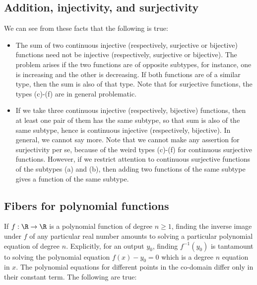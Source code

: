 \documentclass[10pt]{amsart}
\begin{document}
\subsection{Addition, injectivity, and surjectivity}

We can see from these facts that the following is true:

\begin{itemize}
\item The sum of two continuous injective (respectively, surjective or
  bijective) functions need not be injective (respectively, surjective
  or bijective). The problem arises if the two functions are of
  opposite subtypes, for instance, one is increasing and the other is
  decreasing. If both functions are of a similar type, then the sum is
  also of that type. Note that for surjective functions,
  the types (c)-(f) are in general problematic.
\item If we take three continuous injective (respectively, bijective)
  functions, then at least one pair of them has the same subtype, so
  that sum is also of the same subtype, hence is continuous injective
  (respectively, bijective). In general, we cannot say more. Note that
  we cannot make any assertion for surjectivity per se, because of the
  weird types (c)-(f) for continuous surjective functions. However, if
  we restrict attention to continuous surjective functions of the
  subtypes (a) and (b), then adding two functions of the same subtype
  gives a function of the same subtype.
\end{itemize}

\subsection{Fibers for polynomial functions}

If $f:\R \to \R$ is a polynomial function of degree $n \ge 1$, finding
the inverse image under $f$ of any particular real number amounts to
solving a particular polynomial equation of degree $n$. Explicitly,
for an output $y_0$, finding $f^{-1}(y_0)$ is tantamount to solving
the polynomial equation $f(x) - y_0 = 0$ which is a degree $n$
equation in $x$. The polynomial equations for different points in the
co-domain differ only in their constant term. The following are true:
\end{document}
